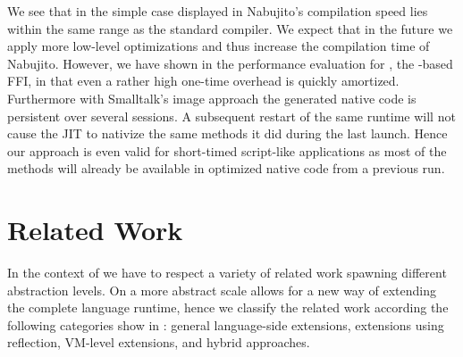 We see that in the simple case displayed in  Nabujito's compilation speed lies within the same range as the standard \ST compiler.
We expect that in the future we apply more low-level optimizations and thus increase the compilation time of Nabujito.
However, we have shown in the performance evaluation for \NB, the \B-based FFI, in  that even a rather high one-time overhead is quickly amortized.
Furthermore with Smalltalk's image approach the generated native code is persistent over several sessions.
A subsequent restart of the same runtime will not cause the JIT to nativize the same methods it did during the last launch.
Hence our approach is even valid for short-timed script-like applications as most of the methods will already be available in optimized native code from a previous run.


\section{Related Work}

In the context of \B we have to respect a variety of related work spawning different abstraction levels.
On a more abstract scale \B allows for a new way of extending the complete language runtime, hence we classify the related work according the following categories show in : general language-side extensions, extensions using reflection, VM-level extensions, and hybrid approaches.
%
%
%

